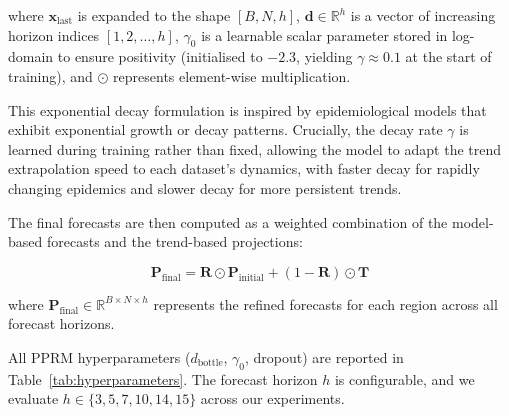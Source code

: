 \documentclass[final,1p,times]{elsarticle}
\begin{document}
where $\mathbf{x}_{\text{last}}$ is expanded to the shape $[B, N, h]$, $\mathbf{d} \in \mathbb{R}^h$ is a vector of increasing horizon indices $[1, 2, \ldots, h]$, $\gamma_0$ is a learnable scalar parameter stored in log-domain to ensure positivity (initialised to $-2.3$, yielding $\gamma \approx 0.1$ at the start of training), and $\odot$ represents element-wise multiplication.

This exponential decay formulation is inspired by epidemiological models that exhibit exponential growth or decay patterns. Crucially, the decay rate $\gamma$ is learned during training rather than fixed, allowing the model to adapt the trend extrapolation speed to each dataset's dynamics, with faster decay for rapidly changing epidemics and slower decay for more persistent trends.

The final forecasts are then computed as a weighted combination of the model-based forecasts and the trend-based projections:

\begin{equation}
\mathbf{P}_{\text{final}} = \mathbf{R} \odot \mathbf{P}_{\text{initial}} + (1 - \mathbf{R}) \odot \mathbf{T}
\end{equation}

where $\mathbf{P}_{\text{final}} \in \mathbb{R}^{B \times N \times h}$ represents the refined forecasts for each region across all forecast horizons.

All PPRM hyperparameters ($d_{\text{bottle}}$, $\gamma_0$, dropout) are reported in Table~\ref{tab:hyperparameters}. The forecast horizon $h$ is configurable, and we evaluate $h \in \{3, 5, 7, 10, 14, 15\}$ across our experiments.
\end{document}
